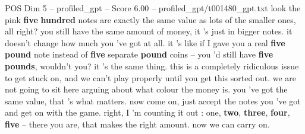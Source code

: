 \begin{textsample}{POS Dim 5 – profiled\_gpt – Score 6.00 – profiled\_gpt/t001480\_gpt.txt}  \label{ex:f5_pos_021}
look the pink \textbf{five} \textbf{hundred} notes are exactly the same value as lots of the smaller ones, all right? you still have the same amount of money, it ’s just in bigger notes. it doesn't change how much you ’ve got at all. it ’s like if I gave you a real \textbf{five} \textbf{pound} note instead of \textbf{five} separate \textbf{pound} coins – you ’d still have \textbf{five} \textbf{pounds}, wouldn't you? it ’s the same thing. this is a completely ridiculous issue to get stuck on, and we can't play properly until you get this sorted out. we are not going to sit here arguing about what colour the money is. you ’ve got the same value, that ’s what matters. now come on, just accept the notes you ’ve got and get on with the game. right, I ’m counting it out : one, \textbf{two}, \textbf{three}, \textbf{four}, \textbf{five} – there you are, that makes the right amount. now we can carry on.

\end{textsample}
